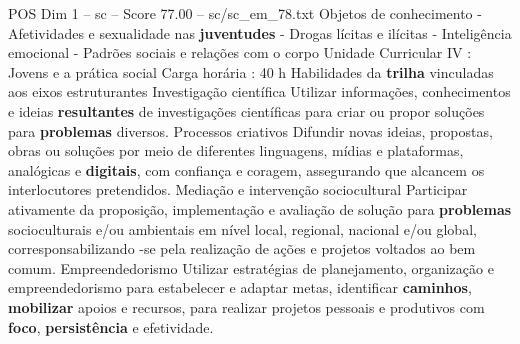 \begin{textsample}{POS Dim 1 – sc – Score 77.00 – sc/sc\_em\_78.txt}
Objetos de conhecimento - Afetividades e sexualidade nas \textbf{juventudes} - Drogas lícitas e ilícitas - Inteligência emocional - Padrões sociais e relações com o corpo Unidade Curricular IV : Jovens e a prática social Carga horária : 40 h Habilidades da \textbf{trilha} vinculadas aos eixos estruturantes Investigação científica Utilizar informações, conhecimentos e ideias \textbf{resultantes} de investigações científicas para criar ou propor soluções para \textbf{problemas} diversos.
Processos criativos Difundir novas ideias, propostas, obras ou soluções por meio de diferentes linguagens, mídias e plataformas, analógicas e \textbf{digitais}, com confiança e coragem, assegurando que alcancem os interlocutores pretendidos.
Mediação e intervenção sociocultural Participar ativamente da proposição, implementação e avaliação de solução para \textbf{problemas} socioculturais e/ou ambientais em nível local, regional, nacional e/ou global, corresponsabilizando -se pela realização de ações e projetos voltados ao bem comum.
Empreendedorismo Utilizar estratégias de planejamento, organização e empreendedorismo para estabelecer e adaptar metas, identificar \textbf{caminhos}, \textbf{mobilizar} apoios e recursos, para realizar projetos pessoais e produtivos com \textbf{foco}, \textbf{persistência} e efetividade.

\end{textsample}
